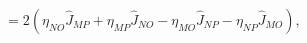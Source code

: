 \begin{equation}
[\hat{J}_{MN},\hat{J}_{OP}]=2\left(
\eta_{NO}\hat{J}_{MP}
+\eta_{MP}\hat{J}_{NO}
-\eta_{MO}\hat{J}_{NP}
-\eta_{NP}\hat{J}_{MO}
\right), 
\label{so(2k+1,1)algebra}
\end{equation}

